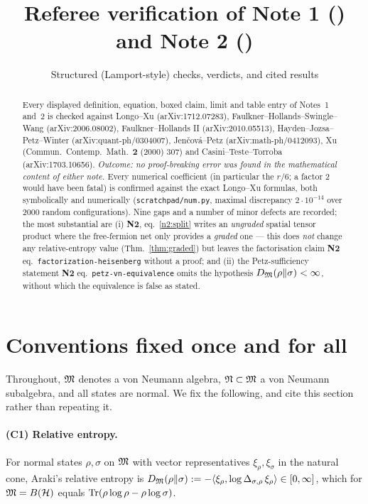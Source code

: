 \documentclass[11pt]{article}
\title{\vspace{-1.6cm}Referee verification of Note 1 (\loc{adjacent\_interval\_cmi\_longo\_xu.tex})\\
and Note 2 (\loc{cmi\_as\_quantum\_markov\_defect.tex})}
\author{Structured (Lamport-style) checks, verdicts, and cited results}
\date{}
\newcommand{\NII}{\textbf{N2}}
\newcommand{\loc}[1]{{\small\texttt{#1}}}
\newcommand{\1}{\mathbf 1}
\begin{document}
\maketitle

\begin{abstract}\noindent
Every displayed definition, equation, boxed claim, limit and table entry of Notes~1 and~2 is checked
against Longo--Xu (arXiv:1712.07283), Faulkner--Hollands--Swingle--Wang (arXiv:2006.08002),
Faulkner--Hollands II (arXiv:2010.05513), Hayden--Jozsa--Petz--Winter (arXiv:quant-ph/0304007),
Jen\v{c}ov\'a--Petz (arXiv:math-ph/0412093), Xu (Commun.\ Contemp.\ Math.\ \textbf{2} (2000) 307)
and Casini--Teste--Torroba (arXiv:1703.10656).
\emph{Outcome: no proof-breaking error was found in the mathematical content of either note.}
Every numerical coefficient (in particular the $r/6$; a factor $2$ would have been fatal) is confirmed
against the exact Longo--Xu formulas, both symbolically and numerically
(\loc{scratchpad/num.py}, maximal discrepancy $2\cdot10^{-14}$ over $2000$ random configurations).
Nine gaps and a number of minor defects are recorded; the most substantial are
(i) \NII, eq.~\eqref{n2:split} writes an \emph{ungraded} spatial tensor product where the free-fermion
net only provides a \emph{graded} one --- this does \emph{not} change any relative-entropy value
(Thm.~\ref{thm:graded}) but leaves the factorisation claim \NII{} eq.~\loc{factorization-heisenberg}
without a proof; and
(ii) the Petz-sufficiency statement \NII{} eq.~\loc{petz-vn-equivalence} omits the hypothesis
$D_{\mathfrak M}(\rho\|\sigma)<\infty$, without which the equivalence is false as stated.
\end{abstract}

\tableofcontents

\section{Conventions fixed once and for all}\label{sec:conv}

Throughout, $\mathfrak M$ denotes a von Neumann algebra, $\mathfrak N\subset\mathfrak M$ a von Neumann subalgebra,
and all states are normal. We fix the following, and cite this section rather than repeating it.

\paragraph{(C1) Relative entropy.}
For normal states $\rho,\sigma$ on $\mathfrak M$ with vector representatives $\xi_\rho,\xi_\sigma$ in the
natural cone, Araki's relative entropy is
$D_{\mathfrak M}(\rho\|\sigma) := -\langle \xi_\rho,\log\Delta_{\sigma,\rho}\,\xi_\rho\rangle\in[0,\infty]$,
which for $\mathfrak M=B(\mathcal H)$ equals $\operatorname{Tr}(\rho\log\rho-\rho\log\sigma)$.
\end{document}
